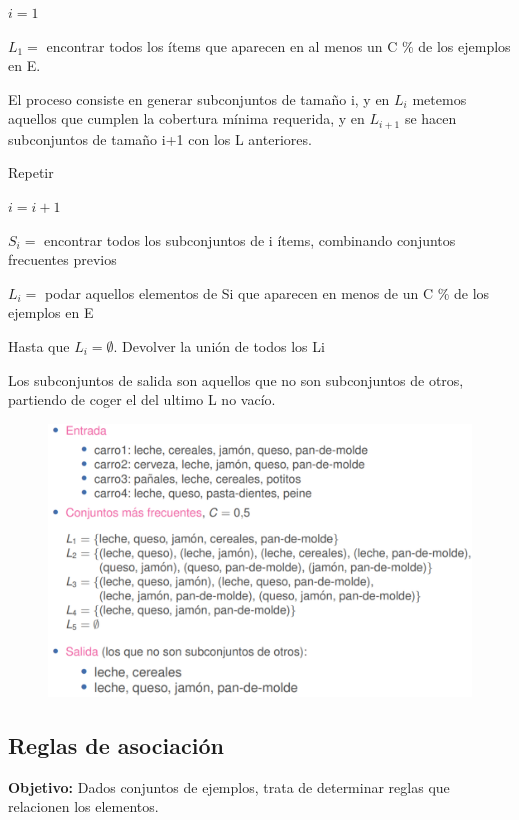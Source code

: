 \documentclass[12pt]{report} %
\begin{document}
$i = 1$

$L_1 =$ encontrar todos los ítems que aparecen en al menos un C \% de los ejemplos en E.

El proceso consiste en generar subconjuntos de tamaño i, y en $L_i$ metemos aquellos que cumplen la cobertura mínima requerida, y en $L_{i+1}$ se hacen subconjuntos de tamaño i+1 con los L anteriores.

\newpage

Repetir

\hspace{6mm} $i = i + 1$

\hspace{6mm} $S_i =$ encontrar todos los subconjuntos de i ítems, combinando conjuntos frecuentes previos

\hspace{6mm} $L_i =$ podar aquellos elementos de Si que aparecen en menos de un C \% de los ejemplos en E

Hasta que $L_i = \emptyset$. Devolver la unión de todos los Li

Los subconjuntos de salida son aquellos que no son subconjuntos de otros, partiendo de coger el del ultimo L no vacío.

\begin{figure}[H]
  {\includegraphics[scale=.4]{2021-04-10 01_06_33-ensembles-reglasAsociacion.pdf - Foxit Reader.png}}
\end{figure}

\subsection{Reglas de asociación}
\textbf{Objetivo:} Dados conjuntos de ejemplos, trata de determinar reglas que relacionen los elementos.
\end{document}

